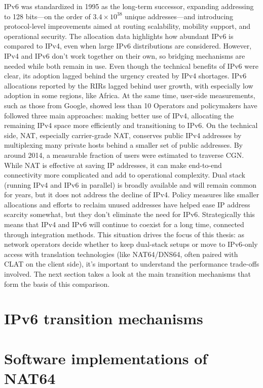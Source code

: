 IPv6 was standardized in 1995 as the long-term successor, expanding addressing to 128 bits—on the order of $3.4 \times 10^{38}$ unique addresses—and introducing protocol-level improvements aimed at routing scalability, mobility support, and operational security\cite{rfc1883,7737362,LEVIN20141059}. The allocation data highlights how abundant IPv6 is compared to IPv4, even when large IPv6 distributions are considered\cite{7737362}. However, IPv4 and IPv6 don't work together on their own, so bridging mechanisms are needed while both remain in use\cite{LEVIN20141059}.
Even though the technical benefits of IPv6 were clear, its adoption lagged behind the urgency created by IPv4 shortages. IPv6 allocations reported by the RIRs lagged behind user growth, with especially low adoption in some regions, like Africa. At the same time, user-side measurements, such as those from Google, showed less than 10%
Operators and policymakers have followed three main approaches: making better use of IPv4, allocating the remaining IPv4 space more efficiently and transitioning to IPv6\cite{LEVIN20141059}. On the technical side, NAT, especially carrier-grade NAT, conserves public IPv4 addresses by multiplexing many private hosts behind a smaller set of public addresses\cite{rfc2663}. By around 2014, a measurable fraction of users were estimated to traverse CGN\cite{livadariu2018inferring}. While NAT is effective at saving IP addresses, it can make end-to-end connectivity more complicated and add to operational complexity\cite{rfc2993}. Dual stack (running IPv4 and IPv6 in parallel) is broadly available and will remain common for years, but it does not address the decline of IPv4\cite{LEVIN20141059}. Policy measures like smaller allocations and efforts to reclaim unused addresses have helped ease IP address scarcity somewhat, but they don't eliminate the need for IPv6\cite{LEVIN20141059}.
Strategically this means that IPv4 and IPv6 will continue to coexist for a long time, connected through integration methods\cite{7737362,LEVIN20141059}. This situation drives the focus of this thesis: as network operators decide whether to keep dual-stack setups or move to IPv6-only access with translation technologies (like NAT64/DNS64, often paired with CLAT on the client side), it's important to understand the performance trade-offs involved. The next section takes a look at the main transition mechanisms that form the basis of this comparison\cite{7737362,LEVIN20141059}.

\section{IPv6 transition mechanisms}

\section{Software implementations of NAT64}